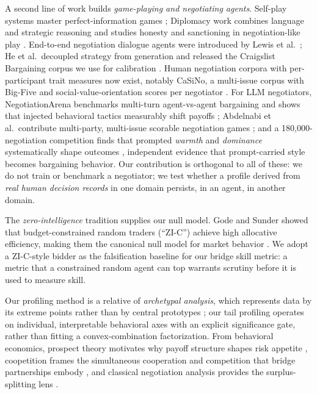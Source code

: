 \documentclass[11pt,a4paper]{article}
\begin{document}
A second line of work builds \emph{game-playing and negotiating
agents}. Self-play systems master
perfect-information games \cite{silver2018general}; Diplomacy work
combines language and strategic reasoning and studies honesty and
sanctioning in negotiation-like play
\cite{kramar2022negotiation,bakhtin2022cicero}. End-to-end negotiation
dialogue agents were introduced by Lewis et al.\
\cite{lewis2017deal}; He et al.\ decoupled strategy from generation and
released the Craigslist Bargaining corpus we use for calibration
\cite{he2018decoupling}. Human negotiation corpora with per-participant
trait measures now exist, notably CaSiNo, a multi-issue corpus with
Big-Five and social-value-orientation scores per negotiator
\cite{chawla2021casino}. For LLM negotiators, NegotiationArena
benchmarks multi-turn agent-vs-agent bargaining and shows that injected
behavioral tactics measurably shift payoffs
\cite{bianchi2024negotiationarena}; Abdelnabi et al.\ contribute
multi-party, multi-issue scorable negotiation games
\cite{abdelnabi2024cooperation}; and a 180{,}000-negotiation
competition finds that prompted \emph{warmth} and \emph{dominance}
systematically shape outcomes \cite{vaccaro2026advancing}, independent evidence that prompt-carried style becomes bargaining
behavior. Our contribution is orthogonal to all of these: we do not
train or benchmark a negotiator; we test whether a profile derived from
\emph{real human decision records} in one domain persists, in an
agent, in another domain.

The \emph{zero-intelligence} tradition supplies our null model. Gode
and Sunder showed that budget-constrained random traders (``ZI-C'')
achieve high allocative efficiency, making them the canonical null
model for market behavior \cite{gode1993zi}. We adopt a ZI-C-style
bidder as the falsification baseline for our bridge skill metric: a
metric that a constrained random agent can top warrants scrutiny before
it is used to measure skill.

Our profiling method is a relative of \emph{archetypal analysis}, which
represents data by its extreme points rather than by central prototypes
\cite{cutler1994archetypal}; our tail profiling operates on individual,
interpretable behavioral axes with an explicit significance gate,
rather than fitting a convex-combination factorization. From
behavioral economics, prospect theory motivates why payoff structure
shapes risk appetite \cite{kahneman1979prospect}, coopetition frames
the simultaneous cooperation and competition that bridge partnerships
embody \cite{brandenburger1996coopetition}, and classical negotiation
analysis provides the surplus-splitting lens
\cite{raiffa1982art,nash1950bargaining}.
\end{document}
